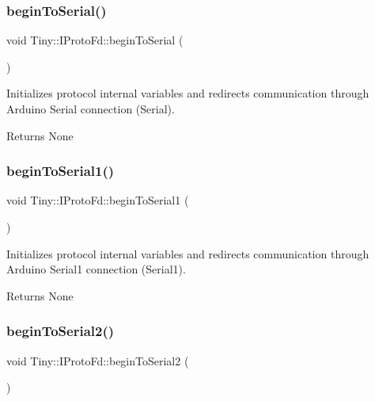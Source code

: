 \subsubsection{\texorpdfstring{begin\+To\+Serial()}{beginToSerial()}}
{\footnotesize\ttfamily void Tiny\+::\+I\+Proto\+Fd\+::begin\+To\+Serial (\begin{DoxyParamCaption}{ }\end{DoxyParamCaption})\hspace{0.3cm}{\ttfamily [inline]}}

Initializes protocol internal variables and redirects communication through Arduino Serial connection (Serial). \begin{DoxyReturn}{Returns}
None 
\end{DoxyReturn}
\mbox{\label{classTiny_1_1IProtoFd_a7d41a0caae1d5e6808a441c821ed8927}} 
\subsubsection{\texorpdfstring{begin\+To\+Serial1()}{beginToSerial1()}}
{\footnotesize\ttfamily void Tiny\+::\+I\+Proto\+Fd\+::begin\+To\+Serial1 (\begin{DoxyParamCaption}{ }\end{DoxyParamCaption})\hspace{0.3cm}{\ttfamily [inline]}}

Initializes protocol internal variables and redirects communication through Arduino Serial1 connection (Serial1). \begin{DoxyReturn}{Returns}
None 
\end{DoxyReturn}
\mbox{\label{classTiny_1_1IProtoFd_ae7582aca0fa5472da6f4ae2911d56259}} 
\subsubsection{\texorpdfstring{begin\+To\+Serial2()}{beginToSerial2()}}
{\footnotesize\ttfamily void Tiny\+::\+I\+Proto\+Fd\+::begin\+To\+Serial2 (\begin{DoxyParamCaption}{ }\end{DoxyParamCaption})\hspace{0.3cm}{\ttfamily [inline]}}

